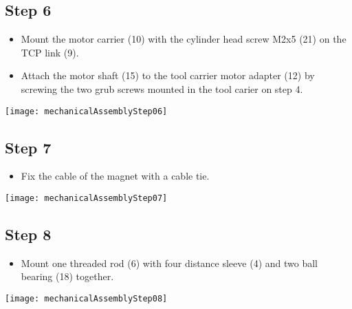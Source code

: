 \subsection*{Step 6}

\begin{minipage}[t]{0.6\textwidth}
	\begin{itemize}
		\item Mount the motor carrier (10) with the cylinder head screw M2x5 (21) on the TCP link (9). 
		\item Attach the motor shaft (15) to the tool carrier motor adapter (12) by screwing the two grub screws mounted in the tool carier on step 4.
	\end{itemize}
\end{minipage}
\hfill
\begin{minipage}[t]{0.35\textwidth}
	\vspace{-\ht\strutbox}\texttt{[image: mechanicalAssemblyStep06]}
	\label{fig:MechanicalAssebmlyStep06} 
\end{minipage}

\subsection*{Step 7}

\begin{minipage}[t]{0.6\textwidth}
	\begin{itemize}
		\item Fix the cable of the magnet with a cable tie.
	\end{itemize}
\end{minipage}
\hfill
\begin{minipage}[t]{0.35\textwidth}
	\vspace{-\ht\strutbox}\texttt{[image: mechanicalAssemblyStep07]}
	\label{fig:MechanicalAssebmlyStep07} 
\end{minipage}

\subsection*{Step 8}

\begin{minipage}[t]{0.6\textwidth}
	\begin{itemize}
		\item Mount one threaded rod (6) with four distance sleeve (4) and two ball bearing (18) together.
	\end{itemize}
\end{minipage}
\hfill
\begin{minipage}[t]{0.35\textwidth}
	\vspace{-\ht\strutbox}\texttt{[image: mechanicalAssemblyStep08]}
	\label{fig:MechanicalAssebmlyStep08} 
\end{minipage}


